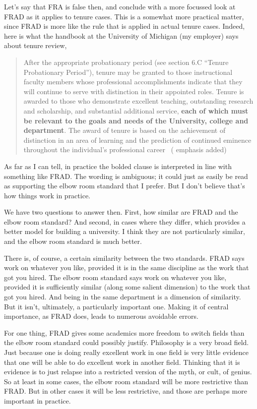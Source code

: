 \documentclass[
  11pt,
  letterpaper,
  DIV=11,
  numbers=noendperiod,
  twoside]{scrartcl}
\begin{document}
Let's say that FRA is false then, and conclude with a more focussed look
at FRAD as it applies to tenure cases. This is a somewhat more practical
matter, since FRAD is more like the rule that is applied in actual
tenure cases. Indeed, here is what the handbook at the University of
Michigan (my employer) says about tenure review,

\begin{quote}
After the appropriate probationary period (see section 6.C ``Tenure
Probationary Period''), tenure may be granted to those instructional
faculty members whose professional accomplishments indicate that they
will continue to serve with distinction in their appointed roles. Tenure
is awarded to those who demonstrate excellent teaching, outstanding
research and scholarship, and substantial additional service,
\textbf{each of which must be relevant to the goals and needs of the
University, college and department}. The award of tenure is based on the
achievement of distinction in an area of learning and the prediction of
continued eminence throughout the individual's professional career
~( emphasis
added)
\end{quote}

As far as I can tell, in practice the bolded clause is interpreted in
line with something like FRAD. The wording is ambiguous; it could just
as easily be read as supporting the elbow room standard that I prefer.
But I don't believe that's how things work in practice.

We have two questions to answer then. First, how similar are FRAD and
the elbow room standard? And second, in cases where they differ, which
provides a better model for building a university. I think they are not
particularly similar, and the elbow room standard is much better.

There is, of course, a certain similarity between the two standards.
FRAD says work on whatever you like, provided it is in the same
discipline as the work that got you hired. The elbow room standard says
work on whatever you like, provided it is sufficiently similar (along
some salient dimension) to the work that got you hired. And being in the
same department is a dimension of similarity. But it isn't, ultimately,
a particularly important one. Making it of central importance, as FRAD
does, leads to numerous avoidable errors.

For one thing, FRAD gives some academics more freedom to switch fields
than the elbow room standard could possibly justify. Philosophy is a
very broad field. Just because one is doing really excellent work in one
field is very little evidence that one will be able to do excellent work
in another field. Thinking that it is evidence is to just relapse into a
restricted version of the myth, or cult, of genius. So at least in some
cases, the elbow room standard will be more restrictive than FRAD. But
in other cases it will be less restrictive, and those are perhaps more
important in practice.
\end{document}
